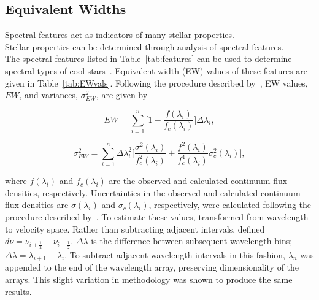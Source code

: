 \subsection{Equivalent Widths}

 Spectral features act as indicators of many stellar properties.  \\
 Stellar properties can be determined through analysis of spectral features.  \\
The spectral features listed in Table~\ref{tab:features} 
can be used to determine spectral types of cool 
stars~\cite{Rayner_2009}.  Equivalent width (EW) 
values of these features are given in Table~\ref{tab:EWvals}.  
Following the procedure described by~\cite{Cushing_2005}, EW values, $EW$, and 
variances, $\sigma_{EW}^{2}$, are given by


\begin{equation}\label{eq:EW}
	EW = \sum_{i=1}^{n} \bigg[1 - \frac{f(\lambda_{i})}{f_{c}(\lambda_{i})} \bigg] \Delta\lambda_{i},
\end{equation}

\begin{equation}\label{eq:EWvar}
	\sigma_{EW}^{2} = \sum_{i=1}^{n} \Delta\lambda_{i}^{2} \bigg[ \frac{\sigma^{2}(\lambda_{i})}{f_{c}^{2}(\lambda_{i})} + \frac{f^{2}(\lambda_{i})}{f_{c}^{4}(\lambda_{i})}\sigma_{c}^{2}(\lambda_{i}) \bigg],
\end{equation}


 where $f(\lambda_{i})$ and $f_{c}(\lambda_{i})$ are the observed 
and calculated continuum flux densities, respectively.  Uncertainties in the 
observed and calculated continuum flux densities are $\sigma(\lambda_{i})$ and 
$\sigma_{c}(\lambda_{i})$, respectively, were calculated following the procedure 
described by~\cite{Sembach_1992}.  To estimate these values, \cite{Sembach_1992} 
transformed from wavelength to velocity space.  Rather than subtracting adjacent intervals, 
\cite{Sembach_1992} defined $d\nu = \nu_{i+\frac{1}{2}} - \nu_{i-\frac{1}{2}}$.  
$\Delta\lambda$ is the difference between subsequent wavelength bins; 
$\Delta\lambda = \lambda_{i+1} - \lambda_{i}$.  To subtract adjacent 
wavelength intervals in this fashion, $\lambda_{n}$ was appended to the 
end of the wavelength array, preserving dimensionality of the arrays.  
This slight variation in methodology was shown to produce the same results.



